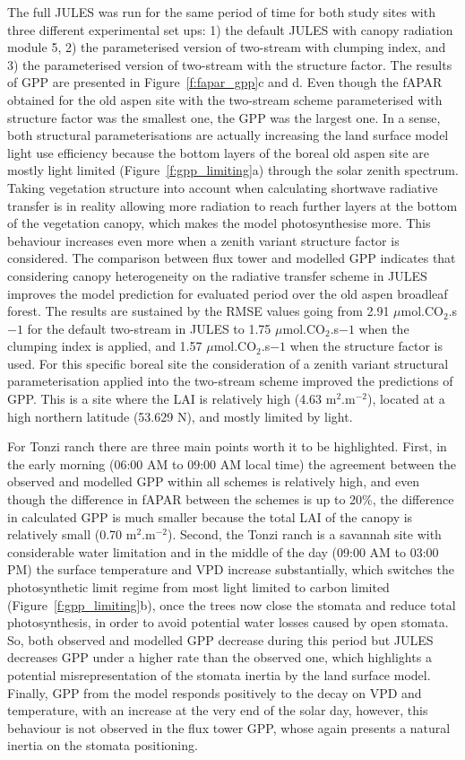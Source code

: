 The full JULES was run for the same period of time for both study sites with three different experimental set ups: 1) the default JULES with canopy radiation module 5, 2) the parameterised version of two-stream with clumping index, and 3) the parameterised version of two-stream with the structure factor. The results of GPP are presented in Figure~\ref{f:fapar_gpp}c and d.
Even though the fAPAR obtained for the old aspen site with the two-stream scheme parameterised with structure factor was the smallest one, the GPP was the largest one. In a sense, both structural parameterisations are actually increasing the land surface model light use efficiency because the bottom layers of the boreal old aspen site are mostly light limited (Figure~\ref{f:gpp_limiting}a) through the solar zenith spectrum. Taking vegetation structure into account when calculating shortwave radiative transfer is in reality allowing more radiation to reach further layers at the bottom of the vegetation canopy, which makes the model photosynthesise more. This behaviour increases even more when a zenith variant structure factor is considered. The comparison between flux tower and modelled GPP indicates that considering canopy heterogeneity on the radiative transfer scheme in JULES improves the model prediction for evaluated period over the old aspen broadleaf forest. The results are sustained by the RMSE values going from 2.91 $\mu$mol.CO$_2$.s$-1$ for the default two-stream in JULES to 1.75 $\mu$mol.CO$_2$.s$-1$ when the clumping index is applied, and 1.57 $\mu$mol.CO$_2$.s$-1$ when the structure factor is used. For this specific boreal site the consideration of a zenith variant structural parameterisation applied into the two-stream scheme improved the predictions of GPP. This is a site where the LAI is relatively high (4.63 m$^2$.m$^{-2}$), located at a high northern latitude (53.629 N), and mostly limited by light.

For Tonzi ranch there are three main points worth it to be highlighted. First, in the early morning (06:00 AM to 09:00 AM local time) the agreement between the observed and modelled GPP within all schemes is relatively high, and even though the difference in fAPAR between the schemes is up to 20\%, the difference in calculated GPP is much smaller because the total LAI of the canopy is relatively small (0.70 m$^2$.m$^{-2}$). Second, the Tonzi ranch is a savannah site with considerable water limitation and in the middle of the day (09:00 AM to 03:00 PM) the surface temperature and VPD increase substantially, which switches the photosynthetic limit regime from most light limited to carbon limited (Figure~\ref{f:gpp_limiting}b), once the trees now close the stomata and reduce total photosynthesis, in order to avoid potential water losses caused by open stomata. So, both observed and modelled GPP decrease during this period but JULES decreases GPP under a higher rate than the observed one, which highlights a potential misrepresentation of the stomata inertia by the land surface model. Finally, GPP from the model responds positively to the decay on VPD and temperature, with an increase at the very end of the solar day, however, this behaviour is not observed in the flux tower GPP, whose again presents a natural inertia on the stomata positioning.

